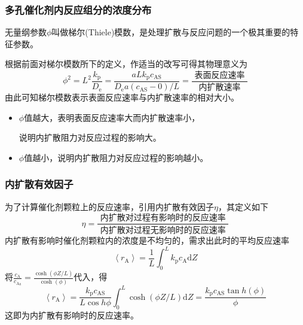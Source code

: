 \begin{frame}
    \frametitle{多孔催化剂内反应组分的浓度分布}

    无量纲参数$\phi$叫做梯尔(Thiele)模数，是处理扩散与反应问题的一个极其重要的特征参数。
    
    根据前面对梯尔模数所下的定义，作适当的改写可得其物理意义为
    \[
        \phi^{2}=L^{2} \frac{k_{\mathrm{p}}}{D_{\mathrm{e}}}=\frac{a L k_{\mathrm{p}} c_{\mathrm{AS}}}{D_{\mathrm{e}} a(c_{\mathrm{AS}}-0) / L}=\frac{\text { 表面反应速率 }}{\text { 内扩散速率 }} 
    \]
    由此可知梯尔模数表示表面反应速率与内扩散速率的相对大小。
    \begin{itemize}
        \item $\phi$值越大，表明表面反应速率大而内扩散速率小，
        
        说明内扩散阻力对反应过程的影响大。
        \item $\phi$值越小，说明内扩散阻力对反应过程的影响越小。
    \end{itemize}
    
\end{frame}


\begin{frame}
    \frametitle{内扩散有效因子}

    为了计算催化剂颗粒上的反应速率，引用内扩散有效因子$\eta$，其定义如下
    \[
        \eta=\frac{\text { 内扩散对过程有影响时的反应速率 }}{\text { 内扩散对过程无影响时的反应速率 }} 
    \]
    内扩散有影响时催化剂颗粒内的浓度是不均匀的，需求出此时的平均反应速率
    \[
        \left\langle r_{\mathrm{A}}\right\rangle=\frac{1}{L} \int_{0}^{L} k_{\mathrm{p}} c_{\mathrm{A}} \mathrm{d} Z
    \]
    将$\frac{c_{\mathrm{A}}}{c_{\mathrm{A}_{\mathrm{S}}}}=\frac{\cosh (\phi Z / L)}{\cosh (\phi)}$代入，得
    \[
        \left\langle r_{\mathrm{A}}\right\rangle=\frac{k_{\mathrm{p}} c_{\mathrm{AS}}}{L \cos h \phi} \int_{0}^{L} \cosh (\phi Z / L) \mathrm{d} Z=\frac{k_{\mathrm{p}} c_{\mathrm{AS}} \tan h(\phi)}{\phi}
    \]
    这即为内扩散有影响时的反应速率。

\end{frame}


